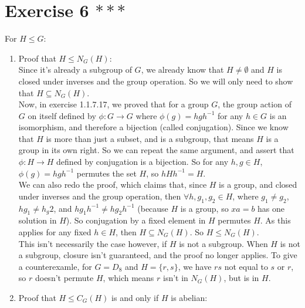 \documentclass[12pt]{article}
\begin{document}
    \section*{Exercise 6 $***$}
    For $H \leqslant G$: \\
    \begin{enumerate}[label=\textbf{\alph*.}]
        \item    
            Proof that $H \leqslant N_G(H)$: \\
            Since it's already a subgroup of $G$,
            we already know that $H \neq \emptyset$
            and $H$ is closed under inverses and the group operation.
            So we will only need to show that $H \subseteq N_G(H)$. \\
            Now, in exercise 1.1.7.17,
            we proved that for a group $G$,
            the group action of $G$ on itself defined by
            $\phi: G \to G$ where $\phi(g) = hgh^{-1}$ for any
            $h \in G$ is an isomorphism,
            and therefore a bijection (called conjugation).
            Since we know that $H$ is more than just a subset,
            and is a subgroup, that means $H$ is a group in its own right.
            So we can repeat the same argument,
            and assert that $\phi: H \to H$ defined by conjugation
            is a bijection.
            So for any $h,g \in H$, $\phi(g) = hgh^{-1}$ permutes
            the set $H$,
            so $ hHh^{-1} = H$. \\
            We can also redo the proof, which claims that,
            since $H$ is a group, and closed under inverses and the group
            operation, then $\forall h, g_1, g_2 \in H$, where $g_1 \neq g_2$,
            $hg_1 \neq h_g2$, and $hg_1h^{-1} \neq hg_2h^{-1}$
            (because $H$ is a group, so $xa = b$ has one solution in $H$).
            So conjugation by a fixed element in $H$ permutes $H$.
            As this applies for any fixed $h \in H$,
            then $H \subseteq N_G(H)$.
            So $H \leqslant N_G(H)$. \\
            This isn't necessarily the case however,
            if $H$ is not a subgroup.
            When $H$ is not a subgroup, closure isn't guaranteed,
            and the proof no longer applies.
            To give a counterexamle, for $G = D_8$ and $H = \{r, s\}$,
            we have $rs$ not equal to $s$ or $r$, so
            $r$ doesn't permute $H$,
            which means $r$ isn't in $N_G(H)$, but is in $H$.
        \item
            Proof that $H \leqslant C_G(H)$ is and only if $H$ is abelian: \\

\end{enumerate}
\end{document}
